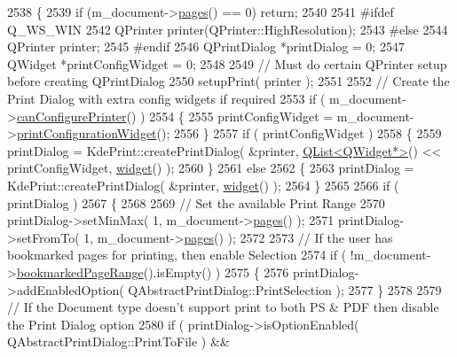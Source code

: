 \begin{DoxyCode}
2538 \{
2539     \textcolor{keywordflow}{if} (m\_document->\hyperlink{classOkular_1_1Document_aaf5d986758e25127946986abaa401bcd}{pages}() == 0) \textcolor{keywordflow}{return};
2540 
2541 \textcolor{preprocessor}{#ifdef Q\_WS\_WIN}
2542     QPrinter printer(QPrinter::HighResolution);
2543 \textcolor{preprocessor}{#else}
2544     QPrinter printer;
2545 \textcolor{preprocessor}{#endif}
2546     QPrintDialog *printDialog = 0;
2547     QWidget *printConfigWidget = 0;
2548 
2549     \textcolor{comment}{// Must do certain QPrinter setup before creating QPrintDialog}
2550     setupPrint( printer );
2551 
2552     \textcolor{comment}{// Create the Print Dialog with extra config widgets if required}
2553     \textcolor{keywordflow}{if} ( m\_document->\hyperlink{classOkular_1_1Document_ad5aa67984b07fc83309ab7798274a60a}{canConfigurePrinter}() )
2554     \{
2555         printConfigWidget = m\_document->\hyperlink{classOkular_1_1Document_acf0fed7059a1b6c96a674074d1b92ffc}{printConfigurationWidget}();
2556     \}
2557     \textcolor{keywordflow}{if} ( printConfigWidget )
2558     \{
2559         printDialog = KdePrint::createPrintDialog( &printer, \hyperlink{classQList}{QList<QWidget*>}() << 
      printConfigWidget, \hyperlink{classKParts_1_1Part_a134900cb0605a1cd5113d90954a01fdf}{widget}() );
2560     \}
2561     \textcolor{keywordflow}{else}
2562     \{
2563         printDialog = KdePrint::createPrintDialog( &printer, \hyperlink{classKParts_1_1Part_a134900cb0605a1cd5113d90954a01fdf}{widget}() );
2564     \}
2565 
2566     \textcolor{keywordflow}{if} ( printDialog )
2567     \{
2568 
2569         \textcolor{comment}{// Set the available Print Range}
2570         printDialog->setMinMax( 1, m\_document->\hyperlink{classOkular_1_1Document_aaf5d986758e25127946986abaa401bcd}{pages}() );
2571         printDialog->setFromTo( 1, m\_document->\hyperlink{classOkular_1_1Document_aaf5d986758e25127946986abaa401bcd}{pages}() );
2572 
2573         \textcolor{comment}{// If the user has bookmarked pages for printing, then enable Selection}
2574         \textcolor{keywordflow}{if} ( !m\_document->\hyperlink{classOkular_1_1Document_ae54c00670b879c5d583e37c51c967860}{bookmarkedPageRange}().isEmpty() )
2575         \{
2576             printDialog->addEnabledOption( QAbstractPrintDialog::PrintSelection );
2577         \}
2578 
2579         \textcolor{comment}{// If the Document type doesn't support print to both PS & PDF then disable the Print Dialog option}
2580         \textcolor{keywordflow}{if} ( printDialog->isOptionEnabled( QAbstractPrintDialog::PrintToFile ) &&

\end{DoxyCode}
